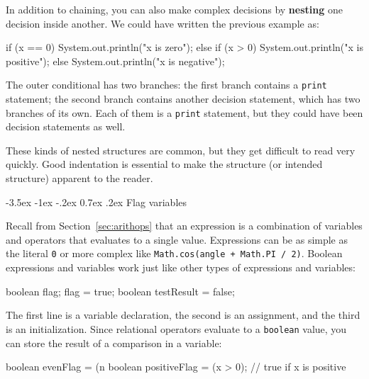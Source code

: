 \documentclass[12pt]{book}
\makeatletter
\theoremstyle{exercise}
\newcommand{\java}[1]{\verb"#1"}
\renewcommand{\section}{\@startsection{section}{1}{\z@}%
    {-3.5ex \@plus -1ex \@minus -.2ex}%
    {0.7ex \@plus.2ex}%
    {\normalfont\Large\bfseries}}
\newcommand{\java}[1]{\lstinline{#1}} %
\makeatother
\begin{document}
In addition to chaining, you can also make complex decisions by {\bf nesting} one decision inside another.
We could have written the previous example as:

\begin{code}
    if (x == 0) {
        System.out.println("x is zero");
    } else {
        if (x > 0) {
            System.out.println("x is positive");
        } else {
            System.out.println("x is negative");
        }
    }
\end{code}

The outer conditional has two branches:
the first branch contains a \java{print} statement; the second branch contains another decision statement, which has two branches of its own.
Each of them is a \java{print} statement, but they could have been decision statements as well.

These kinds of nested structures are common, but they get difficult to read very quickly.
Good indentation is essential to make the structure (or intended structure) apparent to the reader.


\section{Flag variables}


Recall from Section~\ref{sec:arithops} that an expression is a combination of variables and operators that evaluates to a single value.
Expressions can be as simple as the literal \java{0} or more complex like \java{Math.cos(angle + Math.PI / 2)}.
Boolean expressions and variables work just like other types of expressions and variables:

\begin{code}
    boolean flag;
    flag = true;
    boolean testResult = false;
\end{code}


The first line is a variable declaration, the second is an assignment, and the third is an initialization.
Since relational operators evaluate to a \java{boolean} value, you can store the result of a comparison in a variable:

\begin{code}
    boolean evenFlag = (n %
    boolean positiveFlag = (x > 0);     // true if x is positive
\end{code}
\end{document}
